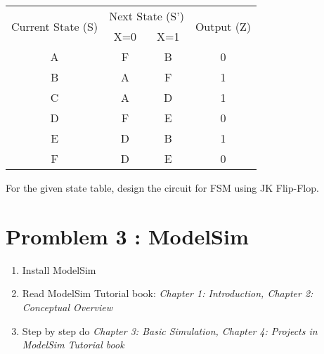 \documentclass[12pt, letterpaper]{article}
\begin{document}
\begin{center}
    \begin{tabular}{|c|cc|c|}
        \hline
        \multirow{2}{*}{Current State (S)} & \multicolumn{2}{c|}{Next State (S')} & \multirow{2}{*}{Output (Z)}     \\ \cline{2-3}
                                           & \multicolumn{1}{c|}{X=0}             & X=1                         &   \\ \hline
        A                                  & \multicolumn{1}{c|}{F  }             & B                           & 0 \\ \hline
        B                                  & \multicolumn{1}{c|}{A  }             & F                           & 1 \\ \hline
        C                                  & \multicolumn{1}{c|}{A  }             & D                           & 1 \\ \hline
        D                                  & \multicolumn{1}{c|}{F  }             & E                           & 0 \\ \hline
        E                                  & \multicolumn{1}{c|}{D  }             & B                           & 1 \\ \hline
        F                                  & \multicolumn{1}{c|}{D  }             & E                           & 0 \\ \hline
    \end{tabular}
\end{center}

For the given state table, design the circuit for FSM using JK Flip-Flop.

\pagebreak
\section*{Promblem 3 : ModelSim}

\begin{enumerate}
    \item Install ModelSim
    \item Read ModelSim Tutorial book: \emph{Chapter 1: Introduction, Chapter 2: Conceptual Overview}
    \item Step by step do \emph{Chapter 3: Basic Simulation, Chapter 4: Projects in ModelSim Tutorial book}
\end{enumerate}
\end{document}
